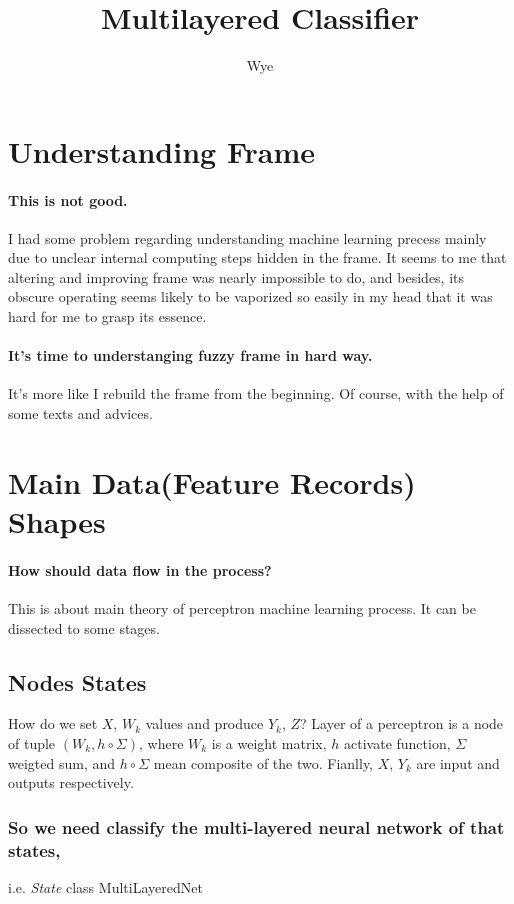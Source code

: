 \documentclass[a4paper, 12pt]{article}
\title{Multilayered Classifier}
\author{Wye}
\begin{document}
    \maketitle
    \newpage

    \section*{Understanding Frame}
    \paragraph*{This is not good.} 
    I had some problem regarding understanding machine learning precess
    mainly due to unclear internal computing steps hidden in the frame. 
    It seems to me that altering and improving frame was nearly impossible
    to do, and besides,
    its obscure operating seems likely to be vaporized so easily in my head
    that it was hard for me to grasp its essence.

    \paragraph*{It's time to understanging fuzzy frame in hard way.}
    It's more like I rebuild the frame from the beginning. Of course,
    with the help of some texts and advices.\cite{saito2017deep}

    \section{Main Data(Feature Records) Shapes}
    \paragraph{How should data flow in the process?}
    This is about main theory of perceptron machine learning process. It can be 
    dissected to some stages. 
    \subsection*{Nodes States} 
    How do we set $X$, $W_k$ values and produce $Y_k$, $Z$? 
    Layer of a perceptron is a node of tuple $(W_k, h\circ  \Sigma)$, 
    where $W_k$ is a weight matrix, $h$ activate function, $\Sigma$ 
    weigted sum, and $h\circ  \Sigma$ mean composite of the two. Fianlly,
    $X$, $Y_k$ are input and outputs respectively.
    \subsubsection{So we need classify the multi-layered neural network of that states,}
    i.e. \emph{State} class MultiLayeredNet
\end{document}
